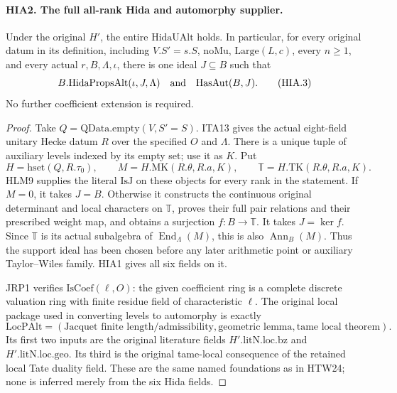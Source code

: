 \paragraph{HIA2. The full all-rank Hida and automorphy supplier.}
\label{claim:HIA2}
Under the original \(H'\), the entire \(\mathrm{HidaUAlt}\)
holds.  In particular, for every original datum in its definition,
including \(V.S'=s.S\), \(\mathrm{noMu}\),
\(\mathrm{Large}(L,c)\), every \(n\geq1\), and every
actual \(r,B,\Lambda,\iota\), there is one ideal \(J\subseteq B\)
such that
\[
 B.\mathrm{HidaPropsAlt}(\iota,J,\Lambda)
                   \quad\hbox{and}\quad \mathrm{HasAut}(B,J).
 \tag{HIA.3}
\]
No further coefficient extension is required.
\begin{proof}
Take \(Q=\mathrm{QData.empty}(V,S'=S)\).  ITA13 gives
the actual eight-field unitary Hecke datum \(R\) over the
specified \(O\) and \(\Lambda\).  There is a unique tuple
of auxiliary levels indexed by its empty set; use it as \(K\).
Put
\[
 H=\mathrm{hset}(Q,R.\tau_0),\qquad
 M=H.\mathrm{MK}(R.\theta,R.a,K),\qquad
 \mathbb T=H.\mathrm{TK}(R.\theta,R.a,K).
 \tag{HIA.4}
\]
HLM9 supplies the literal \(\mathrm{IsJ}\) on these objects
for every rank in the statement.  If \(M=0\), it takes
\(J=B\).  Otherwise it constructs the continuous original
determinant and local characters on \(\mathbb T\), proves
their full pair relations and their prescribed weight map,
and obtains a surjection \(f:B\to\mathbb T\).  It takes
\(J=\ker f\).  Since \(\mathbb T\) is its actual subalgebra
of \(\operatorname{End}_{\Lambda}(M)\), this is also
\(\operatorname{Ann}_B(M)\).  Thus the support ideal has been
chosen before any later arithmetic point or auxiliary
Taylor--Wiles family.  HIA1 gives all six fields on it.

JRP1 verifies \(\mathrm{IsCoef}(\ell,O)\): the given
coefficient ring is a complete discrete valuation ring with
finite residue field of characteristic \(\ell\).
The original local package used in converting levels to
automorphy is exactly
\[
 \mathrm{LocPAlt}=
 (\text{Jacquet finite length/admissibility},
   \text{geometric lemma},\text{tame local theorem}).
 \tag{HIA.5}
\]
Its first two inputs are the original literature fields
\(H'.\mathrm{litN.loc.bz}\) and
\(H'.\mathrm{litN.loc.geo}\).  Its third is the original
tame-local consequence of the retained local Tate duality
field.  These are the same named foundations as in HTW24;
none is inferred merely from the six Hida fields.


\end{proof}

